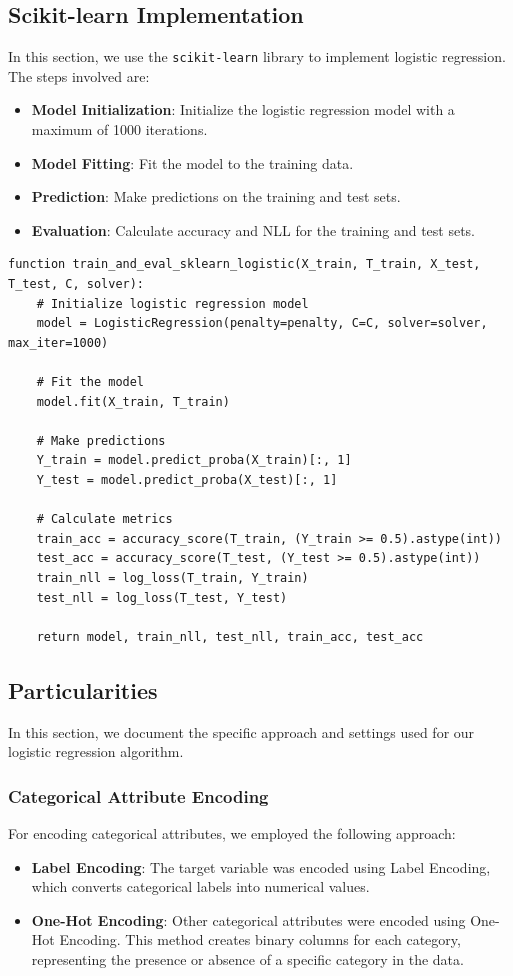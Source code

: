 \documentclass[a4paper,12pt]{article}
\begin{document}
\subsection{Scikit-learn Implementation}
In this section, we use the \texttt{scikit-learn} library to implement logistic regression. The steps involved are:

\begin{itemize}
    \item \textbf{Model Initialization}: Initialize the logistic regression model with a maximum of 1000 iterations.
    \item \textbf{Model Fitting}: Fit the model to the training data.
    \item \textbf{Prediction}: Make predictions on the training and test sets.
    \item \textbf{Evaluation}: Calculate accuracy and NLL for the training and test sets.
\end{itemize}


\begin{verbatim}
function train_and_eval_sklearn_logistic(X_train, T_train, X_test, T_test, C, solver):
    # Initialize logistic regression model
    model = LogisticRegression(penalty=penalty, C=C, solver=solver, max_iter=1000)

    # Fit the model
    model.fit(X_train, T_train)

    # Make predictions
    Y_train = model.predict_proba(X_train)[:, 1]
    Y_test = model.predict_proba(X_test)[:, 1]

    # Calculate metrics
    train_acc = accuracy_score(T_train, (Y_train >= 0.5).astype(int))
    test_acc = accuracy_score(T_test, (Y_test >= 0.5).astype(int))
    train_nll = log_loss(T_train, Y_train)
    test_nll = log_loss(T_test, Y_test)

    return model, train_nll, test_nll, train_acc, test_acc
\end{verbatim}

\subsection{Particularities}

In this section, we document the specific approach and settings used for our logistic regression algorithm.

\subsubsection{Categorical Attribute Encoding}
For encoding categorical attributes, we employed the following approach:
\begin{itemize}
    \item \textbf{Label Encoding}: The target variable was encoded using Label Encoding, which converts categorical labels into numerical values.
    \item \textbf{One-Hot Encoding}: Other categorical attributes were encoded using One-Hot Encoding. This method creates binary columns for each category, representing the presence or absence of a specific category in the data.
\end{itemize}
\end{document}
